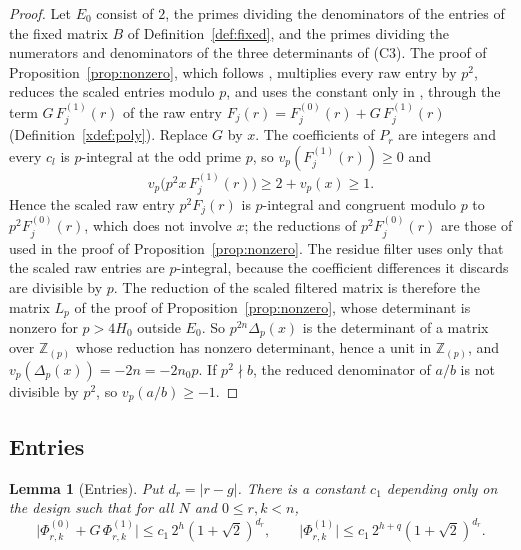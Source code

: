 \documentclass[11pt]{article}
\newtheorem{lemma}[theorem]{Lemma}
\theoremstyle{definition}
\begin{document}
\begin{proof}
Let $E_0$ consist of $2$, the primes dividing the denominators of the entries of the fixed matrix $B$ of Definition~\ref{def:fixed}, and the primes dividing the numerators and denominators of the three determinants of (C3). The proof of Proposition~\ref{prop:nonzero}, which follows \cite[Sec.~4]{OAI}, multiplies every raw entry by $p^2$, reduces the scaled entries modulo $p$, and uses the constant only in \cite[Sec.~4.3]{OAI}, through the term $G\,F^{(1)}_j(r)$ of the raw entry $F_j(r)=F^{(0)}_j(r)+G\,F^{(1)}_j(r)$ (Definition~\ref{xdef:poly}). Replace $G$ by $x$. The coefficients of $P_r$ are integers and every $c_l$ is $p$-integral at the odd prime $p$, so $v_p(F^{(1)}_j(r))\ge0$ and
\[
v_p\big(p^2x\,F^{(1)}_j(r)\big)\ge2+v_p(x)\ge1 .
\]
Hence the scaled raw entry $p^2F_j(r)$ is $p$-integral and congruent modulo $p$ to $p^2F^{(0)}_j(r)$, which does not involve $x$; the reductions of $p^2F^{(0)}_j(r)$ are those of \cite[Eq.~(57)]{OAI} used in the proof of Proposition~\ref{prop:nonzero}. The residue filter \cite[Eq.~(58)]{OAI} uses only that the scaled raw entries are $p$-integral, because the coefficient differences it discards are divisible by $p$. The reduction of the scaled filtered matrix is therefore the matrix $L_p$ of the proof of Proposition~\ref{prop:nonzero}, whose determinant is nonzero for $p>4H_0$ outside $E_0$. So $p^{2n}\Delta_p(x)$ is the determinant of a matrix over $\mathbb Z_{(p)}$ whose reduction has nonzero determinant, hence a unit in $\mathbb Z_{(p)}$, and $v_p(\Delta_p(x))=-2n=-2n_0p$. If $p^2\nmid b$, the reduced denominator of $a/b$ is not divisible by $p^2$, so $v_p(a/b)\ge-1$.
\end{proof}

\subsection{Entries}\label{xsec:size}

\begin{lemma}[Entries]\label{xlem:entries}
Put $d_r=|r-g|$. There is a constant $c_1$ depending only on the design such that for all $N$ and $0\le r,k<n$,
\[
\big|\Phi^{(0)}_{r,k}+G\,\Phi^{(1)}_{r,k}\big|\le c_1\,2^h(1+\sqrt2)^{d_r},\qquad \big|\Phi^{(1)}_{r,k}\big|\le c_1\,2^{h+q}(1+\sqrt2)^{d_r}.
\]
\end{lemma}
\end{document}
